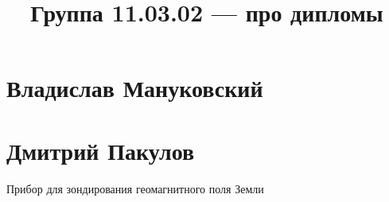 \documentclass{article}
\title{Группа 11.03.02 --- про дипломы}
\begin{document}
\section*{Владислав Мануковский}
\section*{Дмитрий Пакулов}
Прибор для зондирования геомагнитного поля Земли
\end{document}
